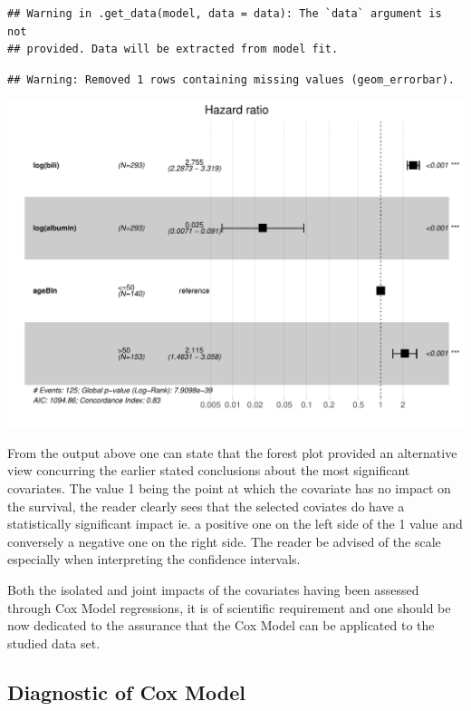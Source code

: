 \documentclass[]{article}
\begin{document}
\begin{verbatim}
## Warning in .get_data(model, data = data): The `data` argument is not
## provided. Data will be extracted from model fit.
\end{verbatim}

\begin{verbatim}
## Warning: Removed 1 rows containing missing values (geom_errorbar).
\end{verbatim}

\includegraphics{survival_pbc_files/figure-latex/unnamed-chunk-36-1.pdf}

From the output above one can state that the forest plot provided an
alternative view concurring the earlier stated conclusions about the
most significant covariates. The value 1 being the point at which the
covariate has no impact on the survival, the reader clearly sees that
the selected coviates do have a statistically significant impact ie. a
positive one on the left side of the 1 value and conversely a negative
one on the right side. The reader be advised of the scale especially
when interpreting the confidence intervals.

Both the isolated and joint impacts of the covariates having been
assessed through Cox Model regressions, it is of scientific requirement
and one should be now dedicated to the assurance that the Cox Model can
be applicated to the studied data set.

\subsection{Diagnostic of Cox Model}\label{diagnostic-of-cox-model}
\end{document}
